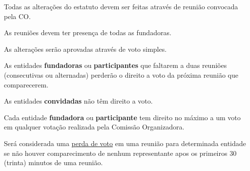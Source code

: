\begin{article}
	Todas as alterações do estatuto devem ser feitas através de reunião convocada pela CO.

	\begin{xparagraph}
		As reuniões devem ter presença de todas as fundadoras.
	\end{xparagraph}

	\begin{xparagraph}
		As alterações serão aprovadas através de voto simples.
	\end{xparagraph}
\end{article}

\begin{article}
	As entidades \textbf{fundadoras} ou \textbf{participantes} que faltarem a duas reuniões (consecutivas ou alternadas) perderão o direito a voto da próxima reunião que comparecerem.

	\begin{xparagraph}
		As entidades \textbf{convidadas} não têm direito a voto.
	\end{xparagraph}

	\begin{xparagraph}
		Cada entidade \textbf{fundadora} ou \textbf{participante} tem direito no máximo a um voto em qualquer votação realizada pela Comissão Organizadora.
	\end{xparagraph}

	\begin{xparagraph}
		Será considerada uma \underline{perda de voto} em uma reunião para determinada entidade se não houver comparecimento de nenhum representante apos os primeiros 30 (trinta) minutos de uma reunião.
	\end{xparagraph}
\end{article}

